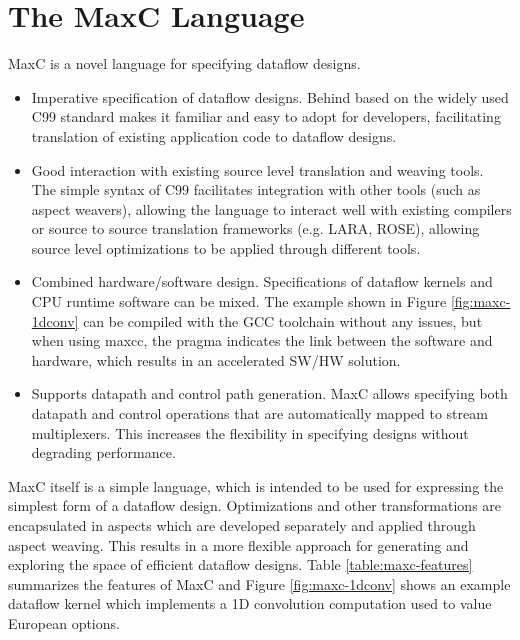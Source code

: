 \section{The  MaxC Language}

MaxC is a novel language for specifying dataflow designs.

\begin{itemize}
\item Imperative specification of dataflow designs. Behind based on the
  widely used C99 standard makes it familiar and easy to adopt for
  developers, facilitating translation of existing application code to
  dataflow designs.
\item Good interaction with existing source level translation and
  weaving tools. The simple syntax of C99 facilitates integration with
  other tools (such as aspect weavers), allowing the language to
  interact well with existing compilers or source to source
  translation frameworks (e.g. LARA, ROSE), allowing source level
  optimizations to be applied through different tools.
\item Combined hardware/software design. Specifications of dataflow
  kernels and CPU runtime software can be mixed. The example shown in
  Figure \ref{fig:maxc-1dconv} can be compiled with the GCC toolchain
  without any issues, but when using maxcc, the pragma indicates the
  link between the software and hardware, which results in an
  accelerated SW/HW solution.
\item Supports datapath and control path generation. MaxC allows
  specifying both datapath and control operations that are
  automatically mapped to stream multiplexers. This increases the
  flexibility in specifying designs without degrading performance.
\end{itemize}

MaxC itself is a simple language, which is intended to be used for
expressing the simplest form of a dataflow design. Optimizations and
other transformations are encapsulated in aspects which are developed
separately and applied through aspect weaving. This results in a more
flexible approach for generating and exploring the space of efficient
dataflow designs. Table \ref{table:maxc-features} summarizes the
features of MaxC and Figure \ref{fig:maxc-1dconv} shows an example
dataflow kernel which implements a 1D convolution computation used to
value European options.


